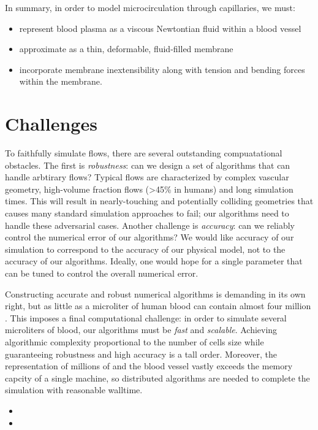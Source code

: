 In summary, in order to model microcirculation through capillaries, we must:
\begin{itemize}
    \item represent blood plasma as a viscous Newtontian fluid within a blood vessel
    \item approximate \rbcs as a thin, deformable, fluid-filled membrane 
    \item incorporate \rbc membrane inextensibility along with tension and bending forces within the membrane.
\end{itemize}

\section{Challenges}
To faithfully simulate \rbc flows, there are several outstanding compuatational obstacles.
The first is \textit{robustness}: can we design a set of algorithms that can handle arbtirary flows?
Typical flows are characterized by complex vascular geometry, high-volume fraction flows (>45\% in humans) and long simulation times. 
This will result in nearly-touching and potentially colliding geometries that causes many standard simulation approaches to fail; our algorithms need to handle these adversarial cases.
Another challenge is \textit{accuracy}: can we reliably control the numerical error of our algorithms?
We would like accuracy of our simulation to correspond to the accuracy of our physical model, not to the accuracy of our algorithms.
Ideally, one would hope for a single parameter that can be tuned to control the overall numerical error.

Constructing accurate and robust numerical algorithms is demanding in its own right, but as little as a microliter of human blood can contain almost four million \rbcs.
This imposes a final computational challenge: in order to simulate several microliters of blood, our algorithms must be \textit{fast} and \textit{scalable}.
Achieving algorithmic complexity proportional to the number of cells size while guaranteeing robustness and high accuracy is a tall order.
Moreover, the representation of millions of \rbcs and the blood vessel vastly exceeds the memory capcity of a single machine, so distributed algorithms are needed to complete the simulation with reasonable walltime.

\begin{itemize}
    \item {}
    \item {}
\end{itemize}

